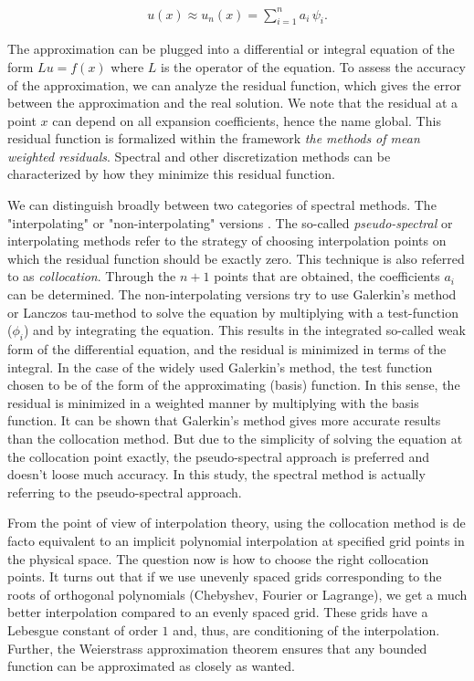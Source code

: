 \begin{align}
u(x) \approx u_n(x) = \sum_{i=1}^{n} a_i \, \psi_i. 
\label{eq:approx}
\end{align}

The approximation can be plugged into a differential or integral equation of
the form $Lu=f(x)$ where $L$ is the operator of the equation. To assess the
accuracy of the approximation, we can analyze the residual function, which
gives the error between the approximation and the real solution. We note that
the residual at a point $x$ can depend on all expansion coefficients, hence the
name global. This residual function is formalized within the framework
\emph{the methods of mean weighted residuals}. Spectral and other
discretization methods can be characterized by how they minimize this residual
function. 

We can distinguish broadly between two categories of spectral methods. The
"interpolating" or "non-interpolating" versions \citep{boyd2001}. The so-called
\emph{pseudo-spectral} or interpolating methods refer to the strategy of
choosing interpolation points on which the residual function should be exactly
zero. This technique is also referred to as \emph{collocation}. Through the
$n+1$ points that are obtained, the coefficients $a_i$ can be determined. The
non-interpolating versions try to use Galerkin's method or Lanczos tau-method
to solve the equation by multiplying with a test-function ($\phi_i$) and by
integrating the equation. This results in the integrated so-called weak form of
the differential equation, and the residual is minimized in terms
of the integral. In the case of the widely used Galerkin's method, the test
function chosen to be of the form of the approximating (basis) function. In
this sense, the residual is minimized in a weighted manner by multiplying with
the basis function. It can be shown that Galerkin's method gives more accurate results
than the collocation method. But due to the simplicity of solving the equation
at the collocation point exactly, the pseudo-spectral approach is preferred and
doesn't loose much accuracy. In this study, the spectral method is actually
referring to the pseudo-spectral approach.

From the point of view of interpolation theory, using the collocation method is
de facto equivalent to an implicit polynomial interpolation at specified grid
points in the physical space. The question now is how to choose the right
collocation points. It turns out that if we use unevenly spaced grids
corresponding to the roots of orthogonal polynomials (Chebyshev, Fourier or
Lagrange), we get a much better interpolation compared to an evenly spaced
grid. These grids have a Lebesgue constant of order $1$ and, thus, are
conditioning of the interpolation. Further, the Weierstrass approximation
theorem ensures that any bounded function can be approximated as closely as
wanted.

